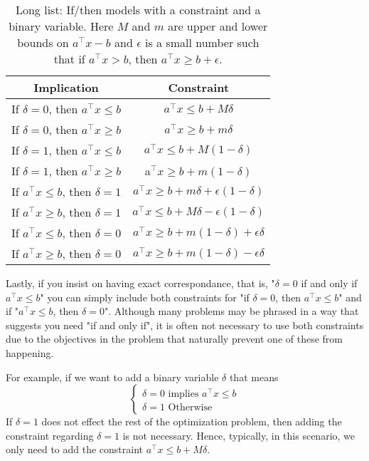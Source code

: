 \documentclass[../open-optimization/open-optimization.tex]{subfiles}
\begin{document}
\begin{table}
\begin{center}
\begin{tabular}{|c|c|}
\hline
\textbf{Implication} & \textbf{Constraint}\\
\hline
If $\delta = 0$, then $a^\top x \leq b$ & $a^\top x \leq b + M \delta$\\
If $\delta = 0$, then $a^\top x \geq b$ & $a^\top x \geq b + m \delta$\\
If $\delta = 1$, then $a^\top x \leq b$ & $a^\top x \leq b + M (1-\delta)$\\
If $\delta = 1$, then $a^\top x \geq b$ & a$^\top x \geq b + m (1-\delta)$\\
If $a^\top x \leq b$, then $\delta = 1$ & $a^\top x \geq b + m \delta + \epsilon(1-\delta)$\\
If $a^\top x \geq b$, then $\delta = 1$ & $a^\top x \leq b + M \delta - \epsilon(1-\delta)$\\
If $a^\top x \leq b$, then $\delta = 0$ & $a^\top x \geq b + m (1-\delta) + \epsilon \delta$\\
If $a^\top x \geq b$, then $\delta = 0$ & $a^\top x \geq b + m (1-\delta) - \epsilon \delta$\\
\hline
\end{tabular}
\end{center}
\caption{Long list: If/then models with a constraint and a binary variable.  Here $M$ and $m$ are upper and lower bounds on $a^\top x - b$ and $\epsilon$ is a small number such that if $a^\top x > b$, then $a^\top x \geq b + \epsilon$.}
\end{table}
Lastly, if you insist on having exact correspondance, that is, "$\delta = 0 $ if and only if $a^\top x \leq b$" you can simply include both constraints for "if $\delta = 0 $, then $a^\top x \leq b$" and if "$a^\top x \leq b$, then $\delta = 0 $".  Although many problems may be phrased in a way that suggests you need "if and only if", it is often not necessary to use both constraints due to the objectives in the problem that naturally prevent one of these from happening.  

For example, if we want to add a binary variable $\delta$ that means
$$
\begin{cases}
\delta = 0 \text{ implies }  a^\top x \leq b\\
\delta = 1  \text{ Otherwise}
\end{cases}
$$
If $\delta = 1$ does not effect the rest of the optimization problem, then adding the constraint regarding $\delta = 1$ is not necessary.  Hence, typically, in this scenario, we only need to add the constraint $a^\top x \leq b + M \delta$.
\end{document}
